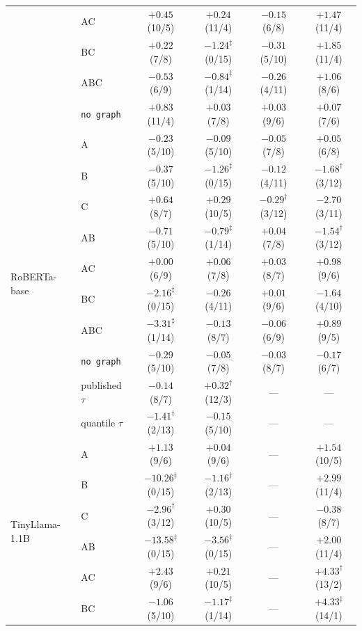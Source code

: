\documentclass{article}
\begin{document}
\begin{table}[h]
\begin{center}
\begin{tabular}{llcccc}
 & AC  & $+0.45$ (10/5) & $\mathbf{+0.24}$ (11/4) & $-0.15$ (6/8) & $+1.47$ (11/4) \\
 & BC  & $+0.22$ (7/8) & $-1.24^{\ddagger}$ (0/15) & $-0.31$ (5/10) & $\mathbf{+1.85}$ (11/4) \\
 & ABC & $-0.53$ (6/9) & $-0.84^{\ddagger}$ (1/14) & $-0.26$ (4/11) & $+1.06$ (8/6) \\
 & \texttt{no graph} & $+0.83$ (11/4) & $+0.03$ (7/8) & $+0.03$ (9/6) & $+0.07$ (7/6) \\
\midrule
\multirow{10}{*}{RoBERTa-base}
 & A   & $-0.23$ (5/10) & $-0.09$ (5/10) & $-0.05$ (7/8) & $+0.05$ (6/8) \\
 & B   & $-0.37$ (5/10) & $-1.26^{\ddagger}$ (0/15) & $-0.12$ (4/11) & $-1.68^{\dagger}$ (3/12) \\
 & C   & $\mathbf{+0.64}$ (8/7) & $+0.29$ (10/5) & $-0.29^{\dagger}$ (3/12) & $-2.70$ (3/11) \\
 & AB  & $-0.71$ (5/10) & $-0.79^{\ddagger}$ (1/14) & $\mathbf{+0.04}$ (7/8) & $-1.54^{\dagger}$ (3/12) \\
 & AC  & $+0.00$ (6/9) & $+0.06$ (7/8) & $+0.03$ (8/7) & $\mathbf{+0.98}$ (9/6) \\
 & BC  & $-2.16^{\ddagger}$ (0/15) & $-0.26$ (4/11) & $+0.01$ (9/6) & $-1.64$ (4/10) \\
 & ABC & $-3.31^{\ddagger}$ (1/14) & $-0.13$ (8/7) & $-0.06$ (6/9) & $+0.89$ (9/5) \\
 & \texttt{no graph} & $-0.29$ (5/10) & $-0.05$ (7/8) & $-0.03$ (8/7) & $-0.17$ (6/7) \\
 & published $\tau$ & $-0.14$ (8/7) & $\mathbf{+0.32}^{\dagger}$ (12/3) & --- & --- \\
 & quantile $\tau$ & $-1.41^{\dagger}$ (2/13) & $-0.15$ (5/10) & --- & --- \\
\midrule
\multirow{8}{*}{TinyLlama-1.1B}
 & A   & $+1.13$ (9/6) & $+0.04$ (9/6) & --- & $+1.54$ (10/5) \\
 & B   & $\mathbf{-10.26}^{\ddagger}$ (0/15) & $-1.16^{\dagger}$ (2/13) & --- & $+2.99$ (11/4) \\
 & C   & $-2.96^{\dagger}$ (3/12) & $+0.30$ (10/5) & --- & $-0.38$ (8/7) \\
 & AB  & $\mathbf{-13.58}^{\ddagger}$ (0/15) & $-3.56^{\ddagger}$ (0/15) & --- & $+2.00$ (11/4) \\
 & AC  & $+2.43$ (9/6) & $+0.21$ (10/5) & --- & $+4.33^{\dagger}$ (13/2) \\
 & BC  & $-1.06$ (5/10) & $-1.17^{\ddagger}$ (1/14) & --- & $\mathbf{+4.33}^{\ddagger}$ (14/1) \\

\end{tabular}
\end{center}
\end{table}
\end{document}
